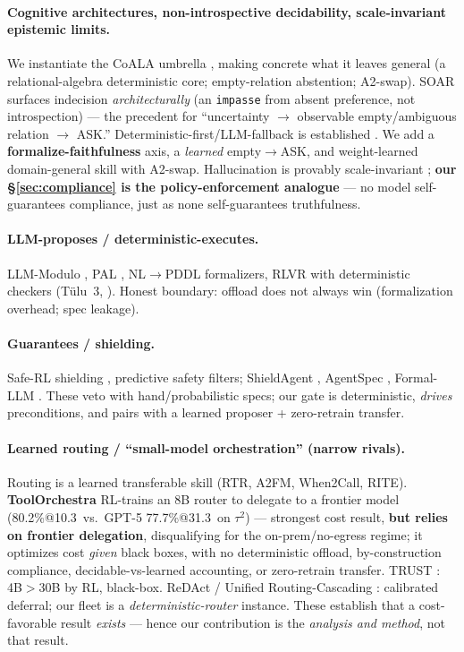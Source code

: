 \documentclass[10pt]{article}
\begin{document}
\paragraph{Cognitive architectures, non-introspective decidability, scale-invariant epistemic limits.} We instantiate the CoALA umbrella \citep{ax2309_02427}, making concrete what it leaves general (a relational-algebra deterministic core; empty-relation abstention; A2-swap). SOAR \citep{ax2505_07087} surfaces indecision \emph{architecturally} (an \texttt{impasse} from absent preference, not introspection) --- the precedent for ``uncertainty $\to$ observable empty/ambiguous relation $\to$ ASK.'' Deterministic-first/LLM-fallback is established \citep{ax2403_00810,ax2510_09355}. We add a \textbf{formalize-faithfulness} axis, a \emph{learned} empty$\to$ASK, and weight-learned domain-general skill with A2-swap. Hallucination is provably scale-invariant \citep{ax2401_11817,ax2509_04664}; \textbf{our \S\ref{sec:compliance} is the policy-enforcement analogue} --- no model self-guarantees compliance, just as none self-guarantees truthfulness.

\paragraph{LLM-proposes / deterministic-executes.} LLM-Modulo \citep{ax2402_01817}, PAL \citep{ax2211_10435}, NL$\to$PDDL formalizers, RLVR with deterministic checkers (T\"ulu~3, \citealp{ax2411_15124}). Honest boundary: offload does not always win (formalization overhead; spec leakage).

\paragraph{Guarantees / shielding.} Safe-RL shielding \citep{ax1807_06096}, predictive safety filters; ShieldAgent \citep{ax2503_22738}, AgentSpec \citep{ax2503_18666}, Formal-LLM \citep{ax2402_00798}. These veto with hand/probabilistic specs; our gate is deterministic, \emph{drives} preconditions, and pairs with a learned proposer + zero-retrain transfer.

\paragraph{Learned routing / ``small-model orchestration'' (narrow rivals).} Routing is a learned transferable skill (RTR, A2FM, When2Call, RITE). \textbf{ToolOrchestra} \citep{ax2511_21689} RL-trains an 8B router to delegate to a frontier model (80.2\%@10.3\textcent\ vs.\ GPT-5 77.7\%@31.3\textcent\ on $\tau^2$) --- strongest cost result, \textbf{but relies on frontier delegation}, disqualifying for the on-prem/no-egress regime; it optimizes cost \emph{given} black boxes, with no deterministic offload, by-construction compliance, decidable-vs-learned accounting, or zero-retrain transfer. TRUST \citep{ax2606_06976}: 4B$>$30B by RL, black-box. ReDAct \citep{ax2604_07036} / Unified Routing-Cascading \citep{ax2410_10347}: calibrated deferral; our fleet is a \emph{deterministic-router} instance. These establish that a cost-favorable result \emph{exists} --- hence our contribution is the \emph{analysis and method}, not that result.
\end{document}
